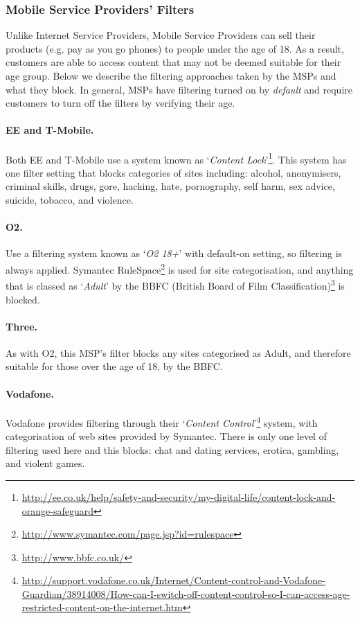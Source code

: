 \documentclass{bmcart}
\begin{document}
\subsubsection*{Mobile Service Providers' Filters}
Unlike Internet Service Providers, Mobile Service Providers can sell their products (e.g. pay as you go phones) to people under the age of 18.
As a result, customers are able to access content that may not be deemed suitable for their age group.
Below we describe the filtering approaches taken by the MSPs and what they block.
In general, MSPs have filtering turned on by \textit{default} and require customers to turn off the filters by verifying their age.

\paragraph{EE and T-Mobile.}
Both EE and T-Mobile use a system known as `\textit{Content Lock}'\footnote{\url{http://ee.co.uk/help/safety-and-security/my-digital-life/content-lock-and-orange-safeguard}}.
This system has one filter setting that blocks categories of sites including: alcohol, anonymisers, criminal skills, drugs, gore, hacking, hate, pornography, self harm, sex advice, suicide, tobacco, and violence.

\paragraph{O2.}
Use a filtering system known as `\textit{O2 18+}' with default-on setting, so filtering is always applied.
Symantec RuleSpace\footnote{\url{http://www.symantec.com/page.jsp?id=rulespace}} is used for site categorisation, and anything that is classed as `\textit{Adult}' by the BBFC (British Board of Film Classification)\footnote{\url{http://www.bbfc.co.uk/}} is blocked.

\paragraph{Three.}
As with O2, this MSP's filter blocks any sites categorised as Adult, and therefore suitable for those over the age of 18, by the BBFC.

\paragraph{Vodafone.}
Vodafone provides filtering through their `\textit{Content Control}'\footnote{\url{http://support.vodafone.co.uk/Internet/Content-control-and-Vodafone-Guardian/38914008/How-can-I-switch-off-content-control-so-I-can-access-age-restricted-content-on-the-internet.htm}} system, with categorisation of web sites provided by Symantec.
There is only one level of filtering used here and this blocks: chat and dating services, erotica, gambling, and violent games.
\end{document}
